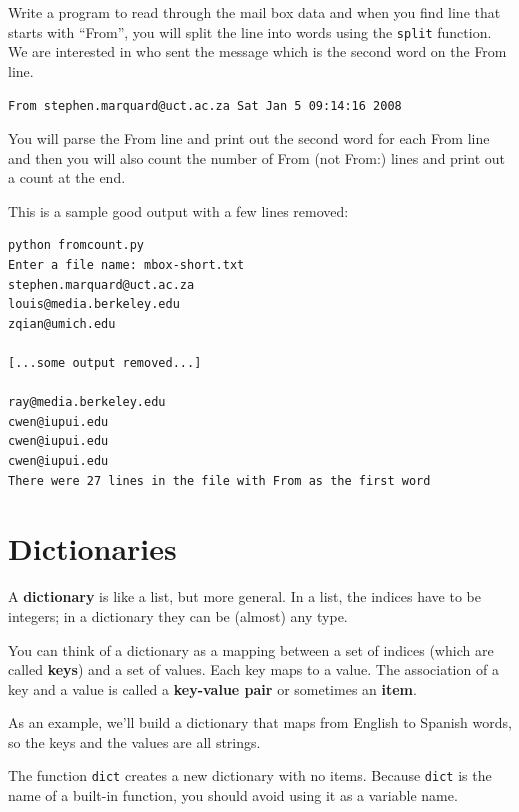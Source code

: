\documentclass[10pt]{book}
\begin{document}
\begin{ex}
Write a program to read through the mail box data and when you find 
line that starts with ``From'', you will split the line into 
words using the {\tt split} function. We are interested in 
who sent the message which is the second word on the From line.

{\tt From stephen.marquard@uct.ac.za Sat Jan  5 09:14:16 2008 }

You will parse the From line and print out the second word for 
each From line and then you will also count the number of 
From (not From:) lines and print out a count at the end.

This is a sample good output with a few lines removed:

\beforeverb
\begin{verbatim}
python fromcount.py 
Enter a file name: mbox-short.txt
stephen.marquard@uct.ac.za
louis@media.berkeley.edu
zqian@umich.edu

[...some output removed...]

ray@media.berkeley.edu
cwen@iupui.edu
cwen@iupui.edu
cwen@iupui.edu
There were 27 lines in the file with From as the first word
\end{verbatim}
\afterverb

\end{ex}


\chapter{Dictionaries}


A {\bf dictionary} is like a list, but more general.  In a list,
the indices have to be integers; in a dictionary they can
be (almost) any type.

You can think of a dictionary as a mapping between a set of indices
(which are called {\bf keys}) and a set of values.  Each key maps to a
value.  The association of a key and a value is called a {\bf
  key-value pair} or sometimes an {\bf item}.

As an example, we'll build a dictionary that maps from English
to Spanish words, so the keys and the values are all strings.

The function {\tt dict} creates a new dictionary with no items.
Because {\tt dict} is the name of a built-in function, you
should avoid using it as a variable name.
\end{document}
